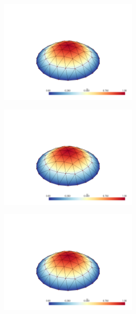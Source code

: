\documentclass[
  11pt,
]{article}
\let\origfigure\figure
\let\endorigfigure\endfigure
\renewenvironment{figure}[1][2] {
    \expandafter\origfigure\expandafter[H]
} {
    \endorigfigure
}
\begin{document}
\begin{figure}
\centering
\includegraphics[width=0.5\textwidth,height=\textheight]{../img/mesh1-gauss05-b.png}
\caption{Finite element solution for problem 1 over mesh number 1 and
order-5 numerical integration.}
\end{figure}

\begin{figure}
\centering
\includegraphics[width=0.5\textwidth,height=\textheight]{../img/mesh1-gauss08-b.png}
\caption{Finite element solution for problem 1 over mesh number 1 and
order-8 numerical integration.}
\end{figure}

\begin{figure}
\centering
\includegraphics[width=0.5\textwidth,height=\textheight]{../img/mesh1-gauss13-b.png}
\caption{Finite element solution for problem 1 over mesh number 1 and
order-13 numerical integration.}
\end{figure}
\end{document}
